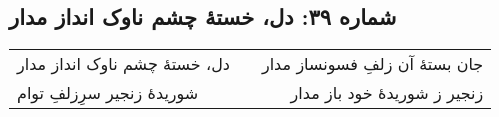 \begin{center}
\section*{شماره ۳۹: دل، خستۀ چشم ناوک انداز مدار}
\label{sec:039}
\begin{longtable}{l p{0.5cm} r}
دل، خستهٔ چشم ناوک انداز مدار
&&
جان بستهٔ آن زلفِ فسونساز مدار
\\
شوریدهٔ زنجیر سرِ‌زلفِ توام
&&
زنجیر ز شوریدهٔ خود باز مدار
\\
\end{longtable}
\end{center}
